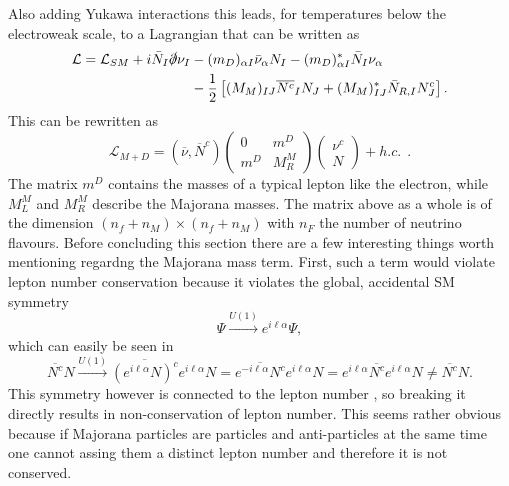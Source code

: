 Also adding Yukawa interactions this leads, for temperatures below the electroweak scale, to a Lagrangian that can be written as \cite[pp. 4f]{Drewes:2013gca}
\begin{align}
	\mathcal{L}=\mathcal{L}_{SM}+i\bar{N}_{I}\slashed\partial\nu_{I}&-(m_D)_{\alpha I}\bar{\nu}_{\alpha}N_{I}-(m_D)_{\alpha I}^*\bar{N}_{I}\nu_{\alpha}
	\label{eq:lagrangian_mass}
	\\
	&-\frac{1}{2}\left[(M_M)_{IJ}\overline{N^c}_{I}N_{J}+(M_M)^*_{IJ}\bar{N}_{R,I}N^c_{J}\right]\nonumber.
\end{align}
This can be rewritten as\cite[Eq. (12)]{Drewes:2013gca}
\begin{equation}
	\mathcal{L}_{M+D}=\left(\overline{\nu},\overline{N}^c\right)	\left(\begin{array}{cc}0&m^D\\m^D&M^M_R\end{array}\right)	\left(\begin{array}{c}\nu^c\\N\end{array}\right)+h.c.\:\:.
	\label{eq_majorana_dirac_zero}
\end{equation}
The matrix $m^D$ contains the masses of a typical lepton like the electron, while $M^M_L$ and $M^M_R$ describe the Majorana masses. The matrix above as a whole is of the dimension \newline $(n_f+n_M)\times(n_f+n_M)$ with $n_F$ the number of neutrino flavours. \newline \indent
Before concluding this section there are a few interesting things worth mentioning regardng the Majorana mass term. 
First, such a term would violate lepton number conservation because it violates the global, accidental SM symmetry 
\begin{equation}
\Psi\overset{U(1)}{\longrightarrow}e^{i\ell\alpha}\Psi,
\end{equation}
which can easily be seen in
\begin{equation*}
\overline{N^c}N \overset{U(1)}{\longrightarrow}\overline{(e^{i \ell \alpha}N)^c}e^{i \ell\alpha}N=\overline{e^{-i \ell\alpha}N^c}e^{i \ell \alpha}N=e^{i \ell \alpha}\overline{N^c}e^{i \ell\alpha}N\neq	\overline{N^c}N.
\end{equation*}
This symmetry however is connected to the lepton number \cite[p. 14]{Bernreuther:2002uj}, so breaking it directly results in non-conservation of lepton number. This seems rather obvious because if Majorana particles are particles and anti-particles at the same time one cannot assing them a distinct lepton number and therefore it is not conserved. \newline \indent
